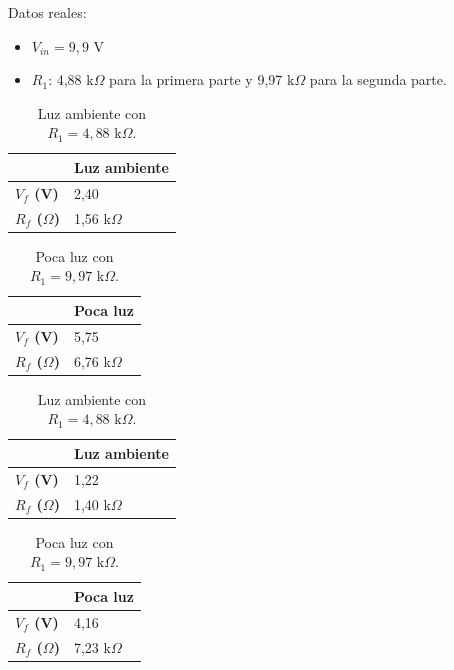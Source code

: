\documentclass[12pt,a4paper]{article}
\begin{document}
Datos reales:
\begin{itemize}
	\item $V_{in} = 9,9$ V
	\item $R_1$: 4,88 k$\Omega$ para la primera parte y 9,97 k$\Omega$ para la segunda parte.
\end{itemize}

\begin{table}[H]
\centering
\begin{tabular}{|C{3cm}|C{3cm}|}
\hline
	& \textbf{Luz ambiente} \\
\hline
\textbf{$V_f$ (V)} & 2,40 \\
\hline
\textbf{$R_f$ ($\Omega$)} & 1,56 k$\Omega$ \\
\hline
\end{tabular}
\caption{Luz ambiente con $R_1 = 4,88$ k$\Omega$.}
\label{tab:3-11}
\end{table}

\begin{table}[H]
\centering
\begin{tabular}{|C{3cm}|C{3cm}|}
\hline
	& \textbf{Poca luz} \\
\hline
\textbf{$V_f$ (V)} & 5,75 \\
\hline
\textbf{$R_f$ ($\Omega$)} & 6,76 k$\Omega$ \\
\hline
\end{tabular}
\caption{Poca luz con $R_1 = 9,97$ k$\Omega$.}
\label{tab:3-12}
\end{table}

\begin{table}[H]
\centering
\begin{tabular}{|C{3cm}|C{3cm}|}
\hline
	& \textbf{Luz ambiente} \\
\hline
\textbf{$V_f$ (V)} & 1,22 \\
\hline
\textbf{$R_f$ ($\Omega$)} & 1,40 k$\Omega$ \\
\hline
\end{tabular}
\caption{Luz ambiente con $R_1 = 4,88$ k$\Omega$.}
\label{tab:3-13}
\end{table}

\begin{table}[H]
\centering
\begin{tabular}{|C{3cm}|C{3cm}|}
\hline
	& \textbf{Poca luz} \\
\hline
\textbf{$V_f$ (V)} & 4,16 \\
\hline
\textbf{$R_f$ ($\Omega$)} & 7,23 k$\Omega$ \\
\hline
\end{tabular}
\caption{Poca luz con $R_1 = 9,97$ k$\Omega$.}
\label{tab:3-14}
\end{table}
\end{document}

